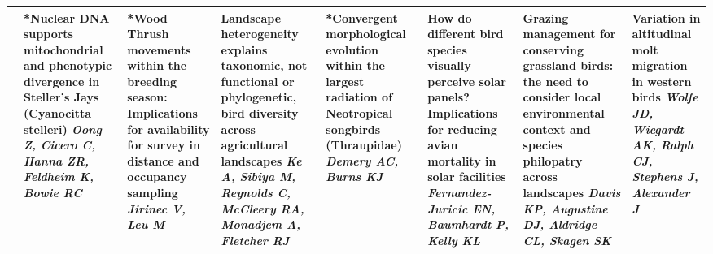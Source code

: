 \begin{tabular}{|x{0.85cm}|a{2.85cm}|x{2.85cm}|x{2.85cm}|x{2.85cm}|a{2.85cm}|a{2.85cm}|a{2.85cm}|}
&*Nuclear DNA supports mitochondrial and phenotypic divergence in Steller's Jays (Cyanocitta stelleri) \newline \newline \textit{Oong Z, Cicero C, Hanna ZR, Feldheim K, Bowie RC} & *Wood Thrush movements within the breeding season: Implications for availability for survey in distance and occupancy sampling \newline \newline \textit{Jirinec V, Leu M} & Landscape heterogeneity explains taxonomic, not functional or phylogenetic, bird diversity across agricultural landscapes \newline \newline \textit{Ke A, Sibiya M, Reynolds C, McCleery RA, Monadjem A, Fletcher RJ} & *Convergent morphological evolution within the largest radiation of Neotropical songbirds (Thraupidae) \newline \newline \textit{Demery AC, Burns KJ} & How do different bird species visually perceive solar panels? Implications for reducing avian mortality in solar facilities \newline \newline \textit{Fernandez-Juricic EN, Baumhardt P, Kelly KL} & Grazing management for conserving grassland birds: the need to consider local environmental context and species philopatry across landscapes \newline \newline \textit{Davis KP, Augustine DJ, Aldridge CL, Skagen SK} & Variation in altitudinal molt migration in western birds \newline \newline \textit{Wolfe JD, Wiegardt AK, Ralph CJ, Stephens J, Alexander J}\\
\hline

\end{tabular}
